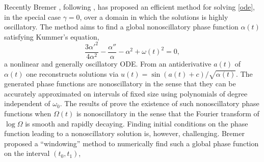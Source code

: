 \documentclass[10pt]{article}
\newcommand{\be}{\begin{equation}}
\newcommand{\ee}{\end{equation}}
\newcommand{\eg}{{\it e.g.\ }}
\newcommand{\bigO}{{\mathcal O}}
\newcommand{\om}{\omega}
\newcommand{\g}{\gamma}
\newcommand{\AB}[1]{{\color{orange}#1}}
\begin{document}
Recently Bremer \cite{bremer2018}, following \cite{heitman2015,bremer2016},
has proposed an efficient
method for solving \cref{ode}, in the special case $\g = 0$,
over a domain in which the solutions is highly oscillatory.
The method aims to find a global nonoscillatory phase function $\alpha(t)$
satisfying Kummer's equation,
\be
\frac{3 \alpha'^2}{4\alpha^2} - \frac{\alpha''}{\alpha} - \alpha^2 +
\om(t)^2 = 0,
\label{kummer}
\ee
a nonlinear and generally oscillatory ODE.
%
From an antiderivative $a(t)$ of $\alpha(t)$ one reconstructs solutions
via $u(t) = \sin(a(t) + c)/\sqrt{\alpha(t)}$.
%
%
The generated phase functions are nonoscillatory in the sense that they can be
accurately approximated on intervals of fixed size
using polynomials of degree independent of $\om_0$.
The results of \cite{heitman2015,bremer2016}
prove the existence of such nonoscillatory phase functions when
$\Omega(t)$ is
nonoscillatory in the sense that the Fourier transform of $\log \Omega$ is smooth
and rapidly decaying.
Finding initial conditions on the phase function leading to
a nonoscillatory solution is, however, challenging.
Bremer proposed a ``windowing'' method to numerically find such a global phase function on the interval $(t_0,t_1)$,
\end{document}
